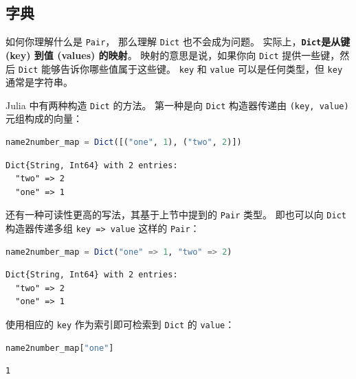 \documentclass[
  notoc %
]{tufte-book}
\newcommand{\passthrough}[1]{#1}
\begin{document}
\hypertarget{sec:dict}{%
\subsection{字典}\label{sec:dict}}

如何你理解什么是 \passthrough{\lstinline!Pair!}， 那么理解
\passthrough{\lstinline!Dict!} 也不会成为问题。
实际上，\textbf{\passthrough{\lstinline!Dict!}是从键 (key) 到值 (values)
的映射}。 映射的意思是说，如果你向 \passthrough{\lstinline!Dict!}
提供一些键，然后 \passthrough{\lstinline!Dict!}
能够告诉你哪些值属于这些键。 \passthrough{\lstinline!key!} 和
\passthrough{\lstinline!value!} 可以是任何类型，但
\passthrough{\lstinline!key!} 通常是字符串。

Julia 中有两种构造 \passthrough{\lstinline!Dict!} 的方法。 第一种是向
\passthrough{\lstinline!Dict!} 构造器传递由
\passthrough{\lstinline!(key, value)!} 元组构成的向量：

\begin{lstlisting}[language=Julia]
name2number_map = Dict([("one", 1), ("two", 2)])
\end{lstlisting}

\begin{lstlisting}[language=Output]
Dict{String, Int64} with 2 entries:
  "two" => 2
  "one" => 1
\end{lstlisting}

还有一种可读性更高的写法，其基于上节中提到的
\passthrough{\lstinline!Pair!} 类型。 即也可以向
\passthrough{\lstinline!Dict!} 构造器传递多组
\passthrough{\lstinline!key => value!} 这样的
\passthrough{\lstinline!Pair!}：

\begin{lstlisting}[language=Julia]
name2number_map = Dict("one" => 1, "two" => 2)
\end{lstlisting}

\begin{lstlisting}[language=Output]
Dict{String, Int64} with 2 entries:
  "two" => 2
  "one" => 1
\end{lstlisting}

使用相应的 \passthrough{\lstinline!key!} 作为索引即可检索到
\passthrough{\lstinline!Dict!} 的 \passthrough{\lstinline!value!}：

\begin{lstlisting}[language=Julia]
name2number_map["one"]
\end{lstlisting}

\begin{lstlisting}[language=Output]
1
\end{lstlisting}
\end{document}

